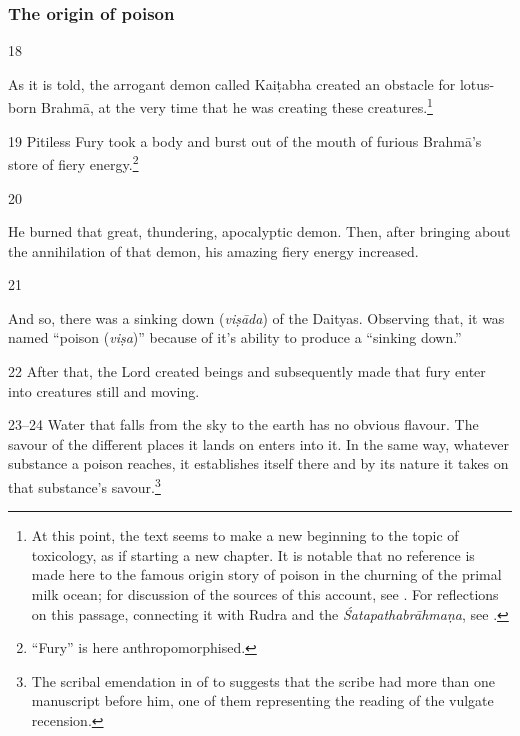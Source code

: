 \subsubsection{The origin of poison}

\begin{translation}[resume]

\item [18]

As it is told, the arrogant demon called Kaiṭabha created an obstacle for
lotus-born Brahmā, at the very time that he was creating these creatures.\footnote{At 
this point, the text seems to make a new beginning to the topic of toxicology, as if 
starting a new chapter.  It is notable that no reference is made here to 
the famous origin story of poison in the churning of the primal milk ocean; for 
discussion of the sources of this account, see \cite{bede-1967}. For  
reflections on this passage, connecting it with Rudra and the 
\emph{Śatapathabrāhmaṇa}, see \cite{mana-2019}.}

\item[19]
Pitiless Fury took a body and burst out of the mouth of furious Brahmā's store of fiery 
energy.\footnote{“Fury” is here anthropomorphised.}

\item[20]

He burned that great, thundering, apocalyptic demon.   Then, after bringing about
the annihilation of that demon, his amazing fiery energy increased.

\item [21]

And so, there was a sinking down (\emph{viṣāda}) of the Daityas.   Observing that,
it was named “poison (\emph{viṣa})” because of it's ability to produce a “sinking
down.”

\item [22] After that, the Lord created beings and subsequently made that fury
enter into creatures still and moving.

\item [23--24] Water that falls from the sky to the earth has no obvious flavour.
The savour of the different places it lands on enters into it.  In the same way,
whatever substance a poison reaches, it establishes itself there and by its nature it 
takes on that substance's savour.\footnote{The scribal emendation in 
 of  to  suggests that the scribe had more than 
one manuscript before him, one of them representing the reading of the vulgate 
recension.}


\end{translation}

